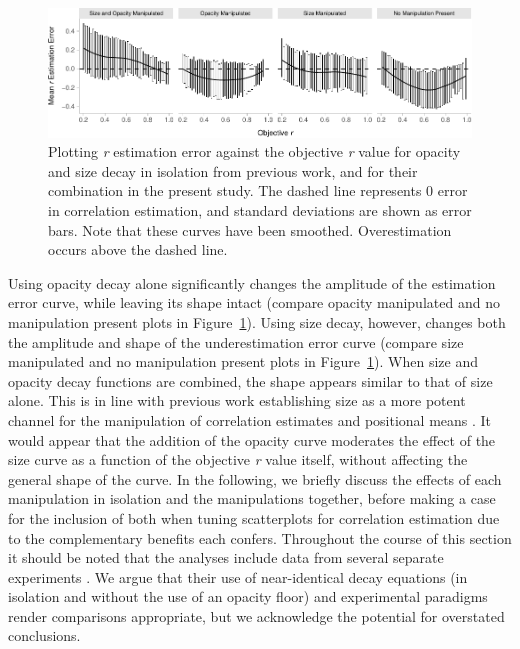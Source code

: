 \documentclass[sigconf]{acmart}
\begin{document}
\begin{figure}

{\centering \includegraphics[width=1\textwidth,height=\textheight]{size_and_opacity_files/figure-pdf/fig-est-multi-exp-1.pdf}

}

\caption{\label{fig-est-multi-exp}Plotting \emph{r} estimation error
against the objective \emph{r} value for opacity and size decay in
isolation from previous work, and for their combination in the present
study. The dashed line represents 0 error in correlation estimation, and
standard deviations are shown as error bars. Note that these curves have
been smoothed. Overestimation occurs above the dashed line.}

\end{figure}

Using opacity decay alone significantly changes the amplitude of the
estimation error curve, while leaving its shape intact (compare opacity
manipulated and no manipulation present plots in
Figure~\ref{fig-est-multi-exp}). Using size decay, however, changes both
the amplitude and shape of the underestimation error curve (compare size
manipulated and no manipulation present plots in
Figure~\ref{fig-est-multi-exp}). When size and opacity decay functions
are combined, the shape appears similar to that of size alone. This is
in line with previous work establishing size as a more potent channel
for the manipulation of correlation estimates \citep{strain_2023b} and
positional means \citep{hong_2021}. It would appear that the addition of
the opacity curve moderates the effect of the size curve as a function
of the objective \emph{r} value itself, without affecting the general
shape of the curve. In the following, we briefly discuss the effects of
each manipulation in isolation and the manipulations together, before
making a case for the inclusion of both when tuning scatterplots for
correlation estimation due to the complementary benefits each confers.
Throughout the course of this section it should be noted that the
analyses include data from several separate experiments
\citep{strain_2023, strain_2023b}. We argue that their use of
near-identical decay equations (in isolation and without the use of an
opacity floor) and experimental paradigms render comparisons
appropriate, but we acknowledge the potential for overstated
conclusions.
\end{document}
